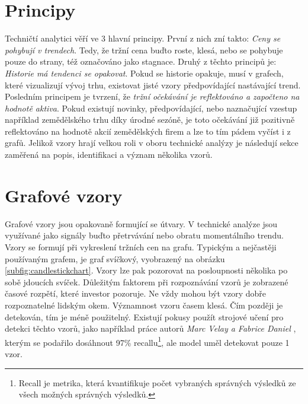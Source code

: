 \section{Principy}
Techničtí analytici věří ve 3 hlavní principy. První z nich zní takto: \emph{Ceny se pohybují v trendech}. Tedy, že tržní cena buďto roste, klesá, nebo se pohybuje
pouze do strany, též označováno jako stagnace. Druhý z těchto principů je: \emph{Historie má tendenci se opakovat}. Pokud se historie
opakuje, musí v grafech, které vizualizují vývoj trhu, existovat jisté vzory předpovídající nastávající trend. Posledním principem je tvrzení, že \emph{tržní očekávání
    je reflektováno a započteno na hodnotě aktiva}. Pokud existují novinky, předpovídající, nebo naznačující vzestup například zemědělského trhu díky úrodné sezóně, je toto
očekávání již pozitivně reflektováno na hodnotě akcií zemědělských firem a lze to tím pádem vyčíst i z grafů. Jelikož vzory hrají velkou roli v oboru technické analýzy
je následují sekce zaměřená na popis, identifikaci a význam několika vzorů.


\section{Grafové vzory}
\label{sec:ChartPatterns}
Grafové vzory jsou opakovaně formující se útvary. V technické analýze jsou využívané jako signály buďto přetrvávání nebo obratu momentálního trendu. Vzory se formují při vykreslení
tržních cen na grafu. Typickým a nejčastěji používaným grafem, je graf svíčkový, vyobrazený na obrázku \ref{subfig:candlestickchart}.
Vzory lze pak
pozorovat na posloupnosti několika po sobě jdoucích svíček. Důležitým faktorem při rozpoznávání vzorů je zobrazené časové rozpětí, které investor pozoruje. Ne vždy mohou
být vzory dobře rozpoznatelné lidským okem. Významnost vzoru časem klesá. Čím později je detekován, tím je méně použitelný.
Existují pokusy \cite{pattern-recognition-using-decision-trees} použít strojové učení pro detekci těchto vzorů, jako například práce
autorů \emph{Marc Velay a Fabrice Daniel} \cite{pattern-recognition-using-ai}, kterým
se podařilo dosáhnout 97\% recallu\footnote{Recall je metrika, která kvantifikuje počet vybraných správných výsledků ze všech možných správných výsledků.}, ale model uměl detekovat pouze 1 vzor.


